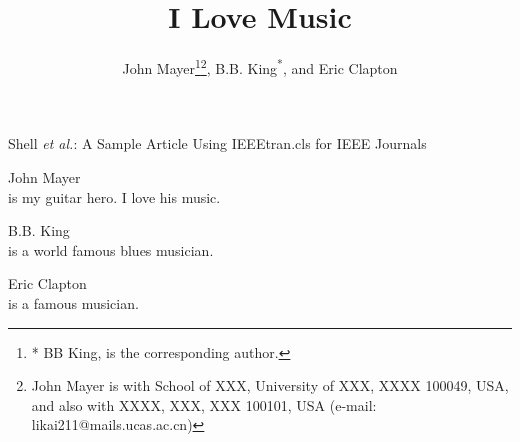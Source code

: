 \documentclass[10pt]{IEEEtran}
\begin{document}
\title{I Love Music}


\author{
        John Mayer\thanks{* BB King, is the corresponding author.}\thanks{John Mayer is with School of XXX, University of XXX, XXXX 100049, USA, 
        and also with XXXX, XXX, XXX 100101, USA (e-mail: likai211@mails.ucas.ac.cn)}, 
        B.B. King\textsuperscript{*},
        and Eric Clapton
} 


%
{Shell \MakeLowercase{\textit{et al.}}: A Sample Article Using IEEEtran.cls for IEEE Journals}


\maketitle
    








 


\begin{IEEEbiography}{John Mayer}\\
       is my guitar hero. I love his music.
\end{IEEEbiography}
\begin{IEEEbiography}{B.B. King}\\
        is a world famous blues musician. 
\end{IEEEbiography}

\begin{IEEEbiography}{Eric Clapton}\\
        is a famous musician. 
\end{IEEEbiography}
\end{document}

